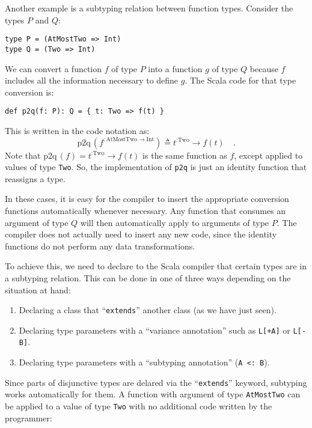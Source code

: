 Another example is a subtyping relation between function types. Consider
the types $P$ and $Q$:
\begin{lstlisting}
type P = (AtMostTwo => Int)
type Q = (Two => Int)
\end{lstlisting}
We can convert a function $f$ of type $P$ into a function $g$ of
type $Q$ because $f$ includes all the information necessary to define
$g$. The Scala code for that type conversion is:
\begin{lstlisting}
def p2q(f: P): Q = { t: Two => f(t) }
\end{lstlisting}
This is written in the code notation as:
\[
\text{p2q}\,(f^{:\text{AtMostTwo}\rightarrow\text{Int}})\triangleq t^{:\text{Two}}\rightarrow f(t)\quad.
\]
Note that $\text{p2q}\,(f)=t^{:\text{Two}}\rightarrow f(t)$ is the
same function as $f$, except applied to values of type \lstinline!Two!.
So, the implementation of \lstinline!p2q! is just an identity function
that reassigns a type.

In these cases, it is easy for the compiler to insert the appropriate
conversion functions automatically whenever necessary. Any function
that consumes an argument of type $Q$ will then automatically apply
to arguments of type $P$. The compiler does not actually need to
insert any new code, since the identity functions do not perform any
data transformations.

To achieve this, we need to declare to the Scala compiler that certain
types are in a subtyping relation. This can be done in one of three
ways depending on the situation at hand:
\begin{enumerate}
\item Declaring a class that \textsf{``}\lstinline!extends!\textsf{''} another class (as
we have just seen).
\item Declaring type parameters with a \textsf{``}variance annotation\textsf{''} such as
\lstinline!L[+A]! or \lstinline!L[-B]!.
\item Declaring type parameters with a \textsf{``}subtyping annotation\textsf{''} (\lstinline!A <: B!).
\end{enumerate}
Since parts of disjunctive types are delared via the \textsf{``}\lstinline!extends!\textsf{''}
keyword, subtyping works automatically for them. A
function with argument of type \lstinline!AtMostTwo! can be applied
to a value of type \lstinline!Two! with no additional code written
by the programmer:

